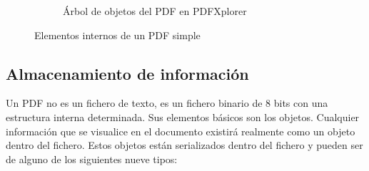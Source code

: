 \begin{figure}
\begin{subfigure}[b]{0.7\textwidth}
        \caption{Árbol de objetos del PDF en PDFXplorer}
        \label{fig:hola-mundo-pdfxplorer}
    \end{subfigure}
    \caption{Elementos internos de un PDF simple}
    \label{fig:estructura-interna-pdf}
\end{figure}


\subsection{Almacenamiento de información}

Un PDF no es un fichero de texto, es un fichero binario de 8 bits con una estructura interna determinada. Sus elementos básicos son los objetos. Cualquier información que se visualice en el documento existirá realmente como un objeto dentro del fichero. Estos objetos están serializados dentro del fichero y pueden ser de alguno de los siguientes nueve tipos:

